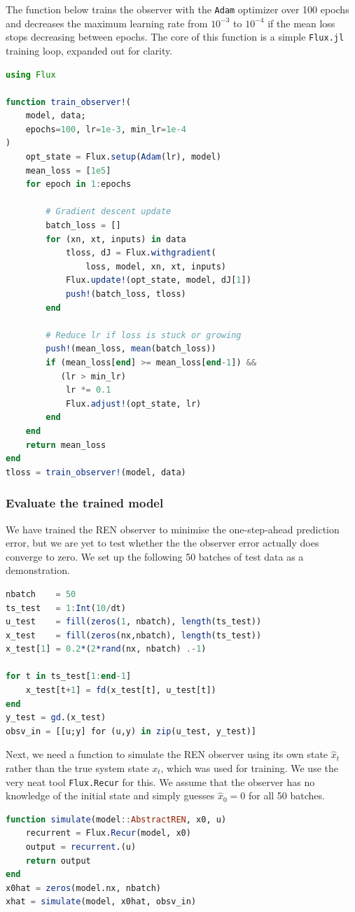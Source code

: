 The function below trains the observer with the \verb|Adam| optimizer over 100 epochs and decreases the maximum learning rate from $10^{-3}$ to $10^{-4}$ if the mean loss stops decreasing between epochs. The core of this function is a simple \verb|Flux.jl| training loop, expanded out for clarity.
\begin{lstlisting}[language = Julia]
using Flux

function train_observer!(
    model, data; 
    epochs=100, lr=1e-3, min_lr=1e-4
)
    opt_state = Flux.setup(Adam(lr), model)
    mean_loss = [1e5]
    for epoch in 1:epochs

        # Gradient descent update
        batch_loss = []
        for (xn, xt, inputs) in data
            tloss, dJ = Flux.withgradient(
                loss, model, xn, xt, inputs)
            Flux.update!(opt_state, model, dJ[1])
            push!(batch_loss, tloss)
        end

        # Reduce lr if loss is stuck or growing
        push!(mean_loss, mean(batch_loss))
        if (mean_loss[end] >= mean_loss[end-1]) && 
           (lr > min_lr)
            lr *= 0.1
            Flux.adjust!(opt_state, lr)
        end
    end
    return mean_loss
end
tloss = train_observer!(model, data)
\end{lstlisting}

\subsubsection{Evaluate the trained model} \label{sec:observer-evaluate}

We have trained the REN observer to minimise the one-step-ahead prediction error, but we are yet to test whether the the observer error actually does converge to zero. We set up the following 50 batches of test data as a demonstration.
\begin{lstlisting}[language = Julia]
nbatch    = 50
ts_test   = 1:Int(10/dt)
u_test    = fill(zeros(1, nbatch), length(ts_test))
x_test    = fill(zeros(nx,nbatch), length(ts_test))
x_test[1] = 0.2*(2*rand(nx, nbatch) .-1)

for t in ts_test[1:end-1]
    x_test[t+1] = fd(x_test[t], u_test[t])
end
y_test = gd.(x_test)
obsv_in = [[u;y] for (u,y) in zip(u_test, y_test)]
\end{lstlisting}

Next, we need a function to simulate the REN observer using its own state $\hat{x}_t$ rather than the true system state $x_t$, which was used for training. We use the very neat tool \verb|Flux.Recur| for this. We assume that the observer has no knowledge of the initial state and simply guesses $\hat{x}_0 = 0$ for all 50 batches.
\begin{lstlisting}[language = Julia]
function simulate(model::AbstractREN, x0, u)
    recurrent = Flux.Recur(model, x0)
    output = recurrent.(u)
    return output
end
x0hat = zeros(model.nx, nbatch)
xhat = simulate(model, x0hat, obsv_in)
\end{lstlisting}


